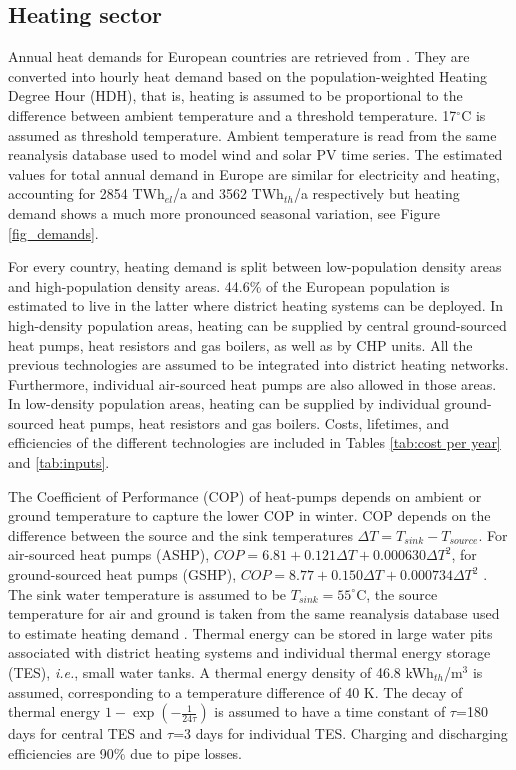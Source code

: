 \documentclass[3p]{elsarticle} %
\begin{document}
\FloatBarrier
\subsection{Heating sector}

Annual heat demands for European countries are retrieved from \cite{HRE}. They are converted into hourly heat demand based on the population-weighted \cite{NUTS3} Heating Degree Hour (HDH), that is, heating is assumed to be proportional to the difference between ambient temperature and a threshold temperature. 17$^{\circ}$C is assumed as threshold temperature. Ambient temperature is read from the same reanalysis database \cite{CFSR} used to model wind and solar PV time series. The estimated values for total annual demand in Europe are similar for electricity and heating, accounting for 2854 TWh$_{el}$/a and 3562 TWh$_{th}$/a respectively but heating demand shows a much more pronounced seasonal variation, see Figure \ref{fig_demands}.

For every country, heating demand is split between low-population density areas and high-population density areas. 44.6\%  of the European population is estimated to live in the latter \cite{Brown_2018} where district heating systems can be deployed. In high-density population areas, heating can be supplied by central ground-sourced heat pumps, heat resistors and gas boilers, as well as by CHP units. All the previous technologies are assumed to be integrated into district heating networks. Furthermore, individual air-sourced heat pumps are also allowed in those areas. In low-density population areas, heating can be supplied by individual ground-sourced heat pumps, heat resistors and gas boilers. Costs, lifetimes, and efficiencies of the different technologies are included in Tables \ref{tab:cost per year} and \ref{tab:inputs}. \

The Coefficient of Performance (COP) of heat-pumps depends on ambient or ground temperature to capture the lower COP in winter. COP depends on the difference between the source and the sink temperatures $\Delta T = T_{sink}-T_{source}$. For air-sourced heat pumps (ASHP), $COP= 6.81 + 0.121 \Delta T +  0.000630 \Delta T^2$, for ground-sourced heat pumps (GSHP), $COP=8.77 + 0.150 \Delta T + 0.000734 \Delta T^2$ \cite{Staffell_2012}. The sink water temperature is assumed to be $T_{sink}=55^{\circ}$C, the source temperature for air and ground is taken from the same reanalysis database used to estimate heating demand \cite{CFSR}. Thermal energy can be stored in large water pits associated with district heating systems and individual thermal energy storage (TES), \textit{i.e.}, small water tanks.  A thermal energy density of 46.8 kWh$_{th}$/m$^3$ is assumed, corresponding to a temperature difference of 40 K. The decay of thermal energy $1 - \exp(- \frac{1}{24 \tau})$ is assumed to have a time constant of $\tau$=180 days for central TES and $\tau$=3 days for individual TES. Charging and discharging efficiencies are 90\% due to pipe losses.\
\end{document}
